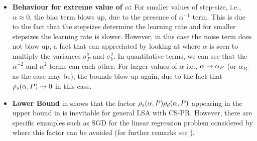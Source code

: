 \begin{itemize}[leftmargin=*, before = \leavevmode\vspace{-\baselineskip}]
\item \textbf{Behaviour for extreme value of $\alpha$:} For smaller values of step-size, i.e., $\alpha\approx 0$, the bias term blows up, due to the presence of $\alpha^{-1}$ term. This is due to the fact that the stepsizes determine the learning rate and for smaller stepsizes the learning rate is slower. However, in this case the noise term does not blow up, a fact that can appreciated by looking at  where $\alpha$ is seen to multiply the variances $\sigma^2_P$ and $\sigma^2_b$. In quantitative terms, we can see that the $\alpha^{-2}$ and $\alpha^2$ terms can each other. For larger values of $\alpha$ i.e., $\alpha\rightarrow \alpha_{P}$ (or $\alpha_{P_U}$ as the case may be), the bounds blow up again, due to the fact that $\rho_s(\alpha,P)\rightarrow 0$ in this case.
\item \textbf{Lower Bound} in  shows that the factor $\rho_s(\alpha,P)\rho_d(\alpha,P)$ appearing in the upper bound in  is inevitable for general LSA with CS-PR. However, there are specific examples such as SGD for the linear regression problem considered by \citet{bach} where this factor can be avoided (for further remarks see ).
\end{itemize}

